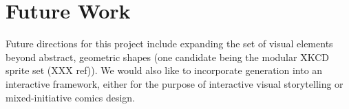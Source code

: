 \section{Future Work}



Future directions for this project include expanding the set of visual
elements beyond abstract, geometric shapes (one candidate being the modular
XKCD sprite set (XXX ref)).
We would also like to incorporate generation into an interactive
framework, either for the purpose of interactive visual storytelling or
mixed-initiative comics design.

